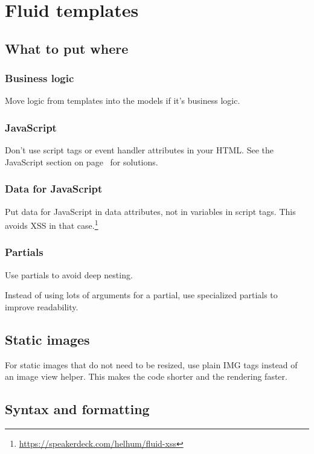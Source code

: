 \chapter{Fluid templates}

\section{What to put where}

\subsection{Business logic}

Move logic from templates into the models if it's business logic.

\subsection{JavaScript}

Don't use script tags or event handler attributes in your HTML. See the JavaScript section on page~\pageref{javascript} for solutions.

\subsection{Data for JavaScript}

Put data for JavaScript in data attributes, not in variables in script tags. This avoids XSS in that case.\footnote{\url{https://speakerdeck.com/helhum/fluid-xss}}

\subsection{Partials}

Use partials to avoid deep nesting.

Instead of using lots of arguments for a partial, use specialized partials to improve readability.


\section{Static images}

For static images that do not need to be resized, use plain IMG tags instead of an image view helper. This makes the code shorter and the rendering faster.


\section{Syntax and formatting}

